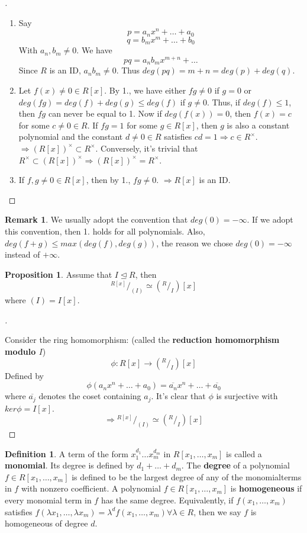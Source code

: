 \documentclass{article}
\theoremstyle{definition}
\newtheorem{dfn}{Definition}[section]
\newtheorem{rem}{Remark}
\newtheorem{prop}{Proposition}
\newenvironment{proofs}[1][\proofname]{%
  \begin{proof}[#1]$ $\par\nobreak\ignorespaces
}{%
  \end{proof}
}
\newcommand*\quot[2]{{^{\textstyle #1}\big/_{\textstyle #2}}}
\begin{document}
\begin{proofs}
  \begin{enumerate}
    \item Say 
      $$p = a_n x^n + \hdots + a_0$$
      $$q = b_m x^m + \hdots + b_0$$
      With $a_n, b_m \neq 0$. We have 
      $$pq = a_n b_m x^{m + n} + \hdots$$
      Since $R$ is an ID, $a_n b_m \neq 0$. Thus $deg(pq) = m + n  = deg(p) + deg(q)$. 
    \item Let $f(x) \neq 0 \in R[x]$. By 1., we have either $fg \neq 0$ if $g = 0$ or $deg(fg) = deg(f) + deg(g) \leq deg(f)$ if $g \neq 0$. Thus, if $deg(f) \leq 1$, then $fg$ can never be equal to 1. Now if $deg(f(x)) = 0$, then $f(x) = c$ for some $c \neq 0 \in R$. If $fg = 1$ for some $g \in R[x]$, then $g$ is also a constant polynomial and the constant $d \neq 0 \in R$ satisfies $cd = 1 \Rightarrow c \in R^\times$. $\Rightarrow (R[x])^\times \subset R^\times$. Conversely, it's trivial that $R^\times \subset (R[x])^\times \Rightarrow (R[x])^\times = R^\times$.
    \item If $f, g \neq 0 \in R[x]$, then by 1., $fg \neq 0$. $\Rightarrow R[x]$ is an ID. 
  \end{enumerate}
\end{proofs}

\begin{rem}
  We usually adopt the convention that $deg(0) = - \infty$. If we adopt this convention, then 1. holds for all polynomials. Also, $deg(f + g) \leq max(deg(f), deg(g))$, the reason we chose $deg(0) = - \infty$ instead of $+ \infty$. 
\end{rem}

\begin{prop}
  Assume that $I \trianglelefteq R$, then 
  $$\quot{R[x]}{(I)} \simeq (\quot{R}{I})[x]$$
  where $(I) = I[x]$. 
\end{prop}

\begin{proofs}
  Consider the ring homomorphism: (called the \textbf{reduction homomorphism modulo $I$})
  $$\phi: R[x] \rightarrow (\quot{R}{I}) [x]$$
  Defined by 
  $$\phi(a_n x^n + \hdots + a_0) = \overline{a_n} x^n + \hdots + \overline{a_0}$$
  where $\overline{a_j}$ denotes the coset containing $a_j$. It's clear that $\phi$ is surjective with $ker \phi = I[x]$. 
  $$\Rightarrow \quot{R[x]}{(I)} \simeq (\quot{R}{I})[x]$$
\end{proofs}

\begin{dfn}
  A term of the form $x_1^{d_1} \hdots x_m^{d_m}$ in $R[x_1, \hdots , x_m]$ is called a \textbf{monomial}. Its degree is defined by $d_1 + \hdots + d_m$. The \textbf{degree} of a polynomial $f \in R[x_1, \hdots , x_m]$ is defined to be the largest degree of any of the monomialterms in $f$ with nonzero coefficient. A polynomial $f \in R[x_1, \hdots , x_m]$ is \textbf{homogeneous} if every monomial term in $f$ has the same degree. Equivalently, if $f(x_1, \hdots , x_m)$ satisfies $f(\lambda x_1, \hdots , \lambda x_m) = \lambda^d f(x_1, \hdots , x_m) \forall \lambda \in R$, then we say $f$ is homogeneous of degree $d$. 
\end{dfn}
\end{document}
